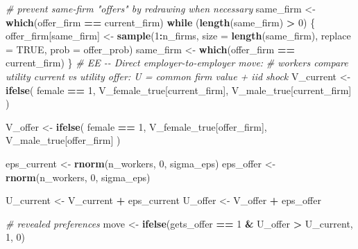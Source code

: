 \documentclass[
]{article}
\newenvironment{Shaded}{\begin{snugshade}}{\end{snugshade}}
\newcommand{\AttributeTok}[1]{\textcolor[rgb]{0.13,0.29,0.53}{#1}}
\newcommand{\CommentTok}[1]{\textcolor[rgb]{0.56,0.35,0.01}{\textit{#1}}}
\newcommand{\ConstantTok}[1]{\textcolor[rgb]{0.56,0.35,0.01}{#1}}
\newcommand{\ControlFlowTok}[1]{\textcolor[rgb]{0.13,0.29,0.53}{\textbf{#1}}}
\newcommand{\DecValTok}[1]{\textcolor[rgb]{0.00,0.00,0.81}{#1}}
\newcommand{\FunctionTok}[1]{\textcolor[rgb]{0.13,0.29,0.53}{\textbf{#1}}}
\newcommand{\NormalTok}[1]{#1}
\newcommand{\OtherTok}[1]{\textcolor[rgb]{0.56,0.35,0.01}{#1}}
\newcommand{\SpecialCharTok}[1]{\textcolor[rgb]{0.81,0.36,0.00}{\textbf{#1}}}
\begin{document}
\begin{Shaded}
\begin{Highlighting}[]
        \CommentTok{\# prevent same{-}firm "offers" by redrawing when necessary}
\NormalTok{        same\_firm }\OtherTok{\textless{}{-}} \FunctionTok{which}\NormalTok{(offer\_firm }\SpecialCharTok{==}\NormalTok{ current\_firm)}
        \ControlFlowTok{while}\NormalTok{ (}\FunctionTok{length}\NormalTok{(same\_firm) }\SpecialCharTok{\textgreater{}} \DecValTok{0}\NormalTok{) \{}
\NormalTok{            offer\_firm[same\_firm] }\OtherTok{\textless{}{-}} \FunctionTok{sample}\NormalTok{(}\DecValTok{1}\SpecialCharTok{:}\NormalTok{n\_firms, }\AttributeTok{size =} \FunctionTok{length}\NormalTok{(same\_firm), }\AttributeTok{replace =} \ConstantTok{TRUE}\NormalTok{, }\AttributeTok{prob =}\NormalTok{ offer\_prob)}
\NormalTok{            same\_firm }\OtherTok{\textless{}{-}} \FunctionTok{which}\NormalTok{(offer\_firm }\SpecialCharTok{==}\NormalTok{ current\_firm)}
\NormalTok{        \}}
        \CommentTok{\# EE {-}{-} Direct employer{-}to{-}employer move:}
        \CommentTok{\# workers compare utility current vs utility offer: U = common firm value + iid shock}
\NormalTok{        V\_current }\OtherTok{\textless{}{-}} \FunctionTok{ifelse}\NormalTok{(}
\NormalTok{            female }\SpecialCharTok{==} \DecValTok{1}\NormalTok{,}
\NormalTok{            V\_female\_true[current\_firm],}
\NormalTok{            V\_male\_true[current\_firm]}
\NormalTok{        )}

\NormalTok{        V\_offer }\OtherTok{\textless{}{-}} \FunctionTok{ifelse}\NormalTok{(}
\NormalTok{            female }\SpecialCharTok{==} \DecValTok{1}\NormalTok{,}
\NormalTok{            V\_female\_true[offer\_firm],}
\NormalTok{            V\_male\_true[offer\_firm]}
\NormalTok{        )}

\NormalTok{        eps\_current }\OtherTok{\textless{}{-}} \FunctionTok{rnorm}\NormalTok{(n\_workers, }\DecValTok{0}\NormalTok{, sigma\_eps)}
\NormalTok{        eps\_offer }\OtherTok{\textless{}{-}} \FunctionTok{rnorm}\NormalTok{(n\_workers, }\DecValTok{0}\NormalTok{, sigma\_eps)}

\NormalTok{        U\_current }\OtherTok{\textless{}{-}}\NormalTok{ V\_current }\SpecialCharTok{+}\NormalTok{ eps\_current}
\NormalTok{        U\_offer }\OtherTok{\textless{}{-}}\NormalTok{ V\_offer }\SpecialCharTok{+}\NormalTok{ eps\_offer}

        \CommentTok{\# revealed preferences}
\NormalTok{        move }\OtherTok{\textless{}{-}} \FunctionTok{ifelse}\NormalTok{(gets\_offer }\SpecialCharTok{==} \DecValTok{1} \SpecialCharTok{\&}\NormalTok{ U\_offer }\SpecialCharTok{\textgreater{}}\NormalTok{ U\_current, }\DecValTok{1}\NormalTok{, }\DecValTok{0}\NormalTok{)}


\end{Highlighting}
\end{Shaded}
\end{document}
